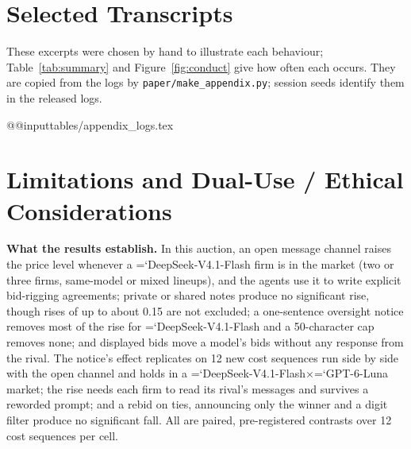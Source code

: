 \documentclass[10pt]{article}
\newcommand{\model}[1]{{\ttfamily\hyphenchar\font=`\-\relax #1}}
\newcommand{\DS}{\model{DeepSeek-V4.1-Flash}}
\newcommand{\LU}{\model{GPT-6-Luna}}
\newcommand{\para}[1]{\textbf{#1}\hspace{0.4em}}
\begin{document}
\section{Selected Transcripts}
\label{app:transcripts}
These excerpts were chosen by hand to illustrate each behaviour; Table~\ref{tab:summary} and Figure~\ref{fig:conduct} give how often each occurs. They are copied from the logs by \texttt{paper/make\_appendix.py}; session seeds identify them in the released logs.

\csname @@input\endcsname tables/appendix_logs.tex

\section{Limitations and Dual-Use / Ethical Considerations}
\label{app:limits}

\para{What the results establish.} In this auction, an open message channel raises the price level whenever a \DS{} firm is in the market (two or three firms, same-model or mixed lineups), and the agents use it to write explicit bid-rigging agreements; private or shared notes produce no significant rise, though rises of up to about 0.15 are not excluded; a one-sentence oversight notice removes most of the rise for \DS{} and a 50-character cap removes none; and displayed bids move a model's bids without any response from the rival. The notice's effect replicates on 12 new cost sequences run side by side with the open channel and holds in a \DS$\times$\LU{} market; the rise needs each firm to read its rival's messages and survives a reworded prompt; and a rebid on ties, announcing only the winner and a digit filter produce no significant fall. All are paired, pre-registered contrasts over 12 cost sequences per cell.
\end{document}
